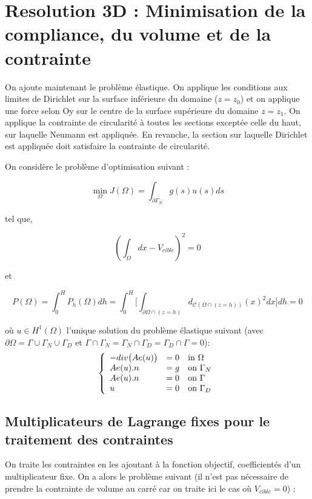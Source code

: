 \documentclass[11pt,a4paper]{article}
\begin{document}
\section*{Resolution 3D : Minimisation de la compliance, du volume et de la contrainte}

On ajoute maintenant le problème élastique. On applique les conditions aux limites de Dirichlet sur la surface inférieure du domaine ($z=z_0$) et on applique une force selon Oy sur le centre de la surface supérieure du domaine $z=z_1$. On applique la contrainte de circularité à toutes les sections exceptée celle du haut, sur laquelle Neumann est appliquée. En revanche, la section sur laquelle Dirichlet est appliquée doit satisfaire la contrainte de circularité.

On considère le problème d'optimisation suivant :

\begin{equation}
\label{eq:objFunction}
\min_{\Omega}J(\Omega)=\int_{\partial\Gamma_N}g(s)u(s)ds 
\end{equation}

tel que,

\begin{equation}
\label{eq:volConst}
(\int_{\Omega}dx-V_{cible})^2=0
\end{equation}

et 

\begin{equation}
\label{eq:constraint3D}
P(\Omega)=\int_{0}^{H}P_h(\Omega)dh=\int_{0}^{H}\Bigg[\int_{\partial\Omega\cap (z=h)}d_{\mathcal{C}(\Omega\cap (z=h))}(x)^2dx\Bigg]dh=0
\end{equation}

où $u\in H^1(\Omega)$ l'unique solution du problème élastique suivant (avec $\partial\Omega=\Gamma\cup\Gamma_N\cup\Gamma_D$ et $\Gamma\cap\Gamma_N=\Gamma_N\cap\Gamma_D=\Gamma_D\cap\Gamma=0$):
\begin{equation}
\label{eq:pbEl2}
\left\{
\begin{array}{lll}
-div\big(Ae(u)\big) & =0 & \textrm{in\,\,}\Omega \\
Ae(u).n & =g & \textrm{on\,\,}\Gamma_N \\
Ae(u).n& =0 & \textrm{on\,\,}\Gamma \\
u&=0&\textrm{on\,\,}\Gamma_D 
\end{array}
\right.
\end{equation}


\subsection*{Multiplicateurs de Lagrange fixes pour le traitement des contraintes}
On traite les contraintes en les ajoutant à la fonction objectif, coefficientés d'un multiplicateur fixe. On a alors le problème suivant (il n'est pas nécessaire de prendre la contrainte de volume au carré car on traite ici le cas où $V_{cible}=0$) :
\end{document}
